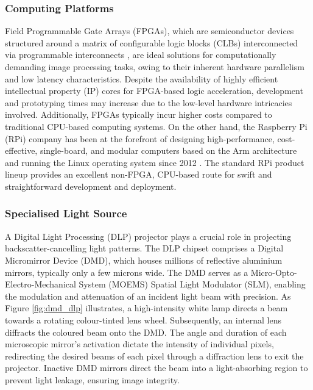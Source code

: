 \subsubsection{Computing Platforms}
Field Programmable Gate Arrays (FPGAs), which are semiconductor devices structured around a matrix of configurable logic blocks (CLBs) interconnected via programmable interconnects \cite{WhatFPGAField}, are ideal solutions for computationally demanding image processing tasks, owing to their inherent hardware parallelism and low latency characteristics. Despite the availability of highly efficient intellectual property (IP) cores for FPGA-based logic acceleration, development and prototyping times may increase due to the low-level hardware intricacies involved. Additionally, FPGAs typically incur higher costs compared to traditional CPU-based computing systems. On the other hand, the Raspberry Pi (RPi) company has been at the forefront of designing high-performance, cost-effective, single-board, and modular computers based on the Arm architecture and running the Linux operating system since 2012 \cite{raspberrypiltdRaspberryPiUs}. The standard RPi product lineup provides an excellent non-FPGA, CPU-based route for swift and straightforward development and deployment.

\subsubsection{Specialised Light Source}

A Digital Light Processing (DLP) projector plays a crucial role in projecting backscatter-cancelling light patterns. The DLP chipset comprises a Digital Micromirror Device (DMD), which houses millions of reflective aluminium mirrors, typically only a few microns wide. The DMD serves as a Micro-Opto-Electro-Mechanical System (MOEMS) Spatial Light Modulator (SLM), enabling the modulation and attenuation of an incident light beam with precision. As Figure \ref{fig:dmd_dlp} illustrates, a high-intensity white lamp directs a beam towards a rotating colour-tinted lens wheel. Subsequently, an internal lens diffracts the coloured beam onto the DMD. The angle and duration of each microscopic mirror's activation dictate the intensity of individual pixels, redirecting the desired beams of each pixel through a diffraction lens to exit the projector. Inactive DMD mirrors direct the beam into a light-absorbing region to prevent light leakage, ensuring image integrity.

